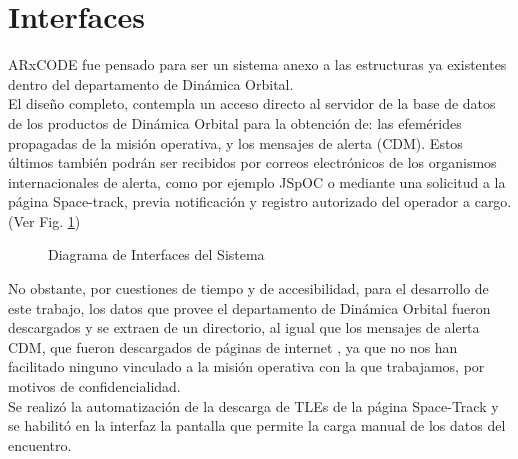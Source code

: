 \section{Interfaces}
ARxCODE fue pensado para ser un sistema anexo a las estructuras ya existentes dentro del departamento de Din\'amica Orbital.\\
El dise\~no completo, contempla un acceso directo al servidor de la base de datos de los productos de Din\'amica Orbital para la obtenci\'on de: las efem\'erides propagadas de la misi\'on operativa, y los mensajes de alerta (CDM). Estos \'ultimos tambi\'en podr\'an ser recibidos por correos electr\'onicos de los organismos internacionales de alerta, como por ejemplo JSpOC o mediante una solicitud a la p\'agina Space-track, previa notificaci\'on y registro autorizado del operador a cargo. (Ver Fig. \ref{fig:interfaces})\\

\begin{figure}
\centering
  \caption[Diagrama de Interfaces del Sistema]{Diagrama de Interfaces del Sistema}
  \label{fig:interfaces}
\end{figure}

No obstante, por cuestiones de tiempo y de accesibilidad, para el desarrollo de este trabajo, los datos que provee el departamento de Din\'amica Orbital fueron descargados y se extraen de un directorio, al igual que los mensajes de alerta CDM, que fueron descargados de p\'aginas de internet , ya que no nos han facilitado ninguno vinculado a la misi\'on operativa con la que trabajamos, por motivos de confidencialidad.\\
Se realiz\'o la automatizaci\'on de la descarga de TLEs de la p\'agina Space-Track y se habilit\'o en la interfaz la pantalla que permite la carga manual de los datos del encuentro.\\

